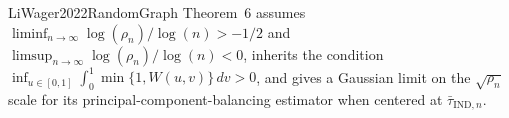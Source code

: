LiWager2022RandomGraph Theorem~6 assumes \(\liminf_{n\to\infty}\log(\rho_n)/\log(n)>-1/2\) and \(\limsup_{n\to\infty}\log(\rho_n)/\log(n)<0\), inherits the condition \(\inf_{u\in[0,1]}\int_0^1\min\{1,W(u,v)\}\,dv>0\), and gives a Gaussian limit on the \(\sqrt{\rho_n}\) scale for its principal-component-balancing estimator when centered at \(\bar\tau_{\mathrm{IND},n}\).